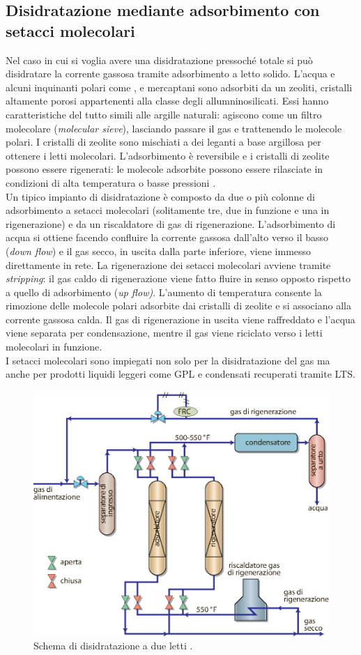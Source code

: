 \subsection{Disidratazione mediante adsorbimento con setacci molecolari}
Nel caso in cui si voglia avere una disidratazione pressoché totale si può disidratare la corrente gassosa tramite adsorbimento a letto solido. L'acqua e alcuni inquinanti polari come ,  e mercaptani sono adsorbiti da un zeoliti, cristalli altamente porosi appartenenti alla classe degli allumninosilicati. Essi hanno caratteristiche del tutto simili alle argille naturali: agiscono come un filtro molecolare (\textit{molecular sieve}), lasciando passare il gas e trattenendo le molecole polari. I cristalli di zeolite sono mischiati a dei leganti a base argillosa per ottenere i letti molecolari. L'adsorbimento è reversibile e i cristalli di zeolite possono essere rigenerati: le molecole adsorbite possono essere rilasciate in condizioni di alta temperatura o basse pressioni \parencite{grace2010techinf}. \\
Un tipico impianto di disidratazione è composto da due o più colonne di adsorbimento a setacci molecolari (solitamente tre, due in funzione e una in rigenerazione) e da un riscaldatore di gas di rigenerazione. L'adsorbimento di acqua si ottiene facendo confluire la corrente gassosa dall'alto verso il basso (\textit{down flow}) e il gas secco, in uscita dalla parte inferiore, viene immesso direttamente in rete. La rigenerazione dei setacci molecolari avviene tramite \textit{stripping}: il gas caldo di rigenerazione viene fatto fluire in senso opposto rispetto a quello di adsorbimento (\textit{up flow)}. L'aumento di temperatura consente la rimozione delle molecole polari adsorbite dai cristalli di zeolite e si associano alla corrente gassosa calda. Il gas di rigenerazione in uscita viene raffreddato e l'acqua viene separata per condensazione, mentre il gas viene riciclato verso i letti molecolari in funzione.\\
I setacci molecolari sono impiegati non solo per la disidratazione del gas ma anche per prodotti liquidi leggeri come GPL e condensati recuperati tramite LTS.

\begin{figure}[htbp]
    \centering
    \includegraphics[width=.7\textwidth]{fig/impianti/molecularsieve.eps}
    \caption{Schema di disidratazione a due letti \parencite{bianco2005impiantigas}.}
    \label{fig:molecularsieve}
\end{figure}

